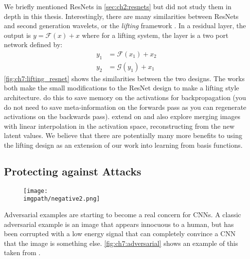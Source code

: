 We briefly mentioned ResNets in \autoref{sec:ch2:resnets} but did not study them
in depth in this thesis. Interestingly, there are many similarities between
ResNets and second generation wavelets, or the \emph{lifting} framework
\cite{sweldens_lifting_1998,daubechies_factoring_1998}.
In a residual layer, the output is $y = \mathcal{F}(x) + x$ where for a lifting
system, the layer is a two port network defined by:
\begin{align}
  y_1 &= \mathcal{F}(x_1) + x_2 \\
  y_2 &= \mathcal{G}(y_1) + x_1 
\end{align}
\autoref{fig:ch7:lifting_resnet} shows the similarities between the two designs. 
The works \cite{gomez_reversible_2017, jacobsen_i-revnet:_2018} both make the small modifications
to the ResNet design to make a lifting style architecture.
\citeauthor{gomez_reversible_2017} \cite{gomez_reversible_2017} do this to save
memory on the activations for backpropagation (you do not need to save
meta-information on the forwards pass as you can regenerate activations on the
backwards pass). 
\citeauthor{jacobsen_i-revnet:_2018} \cite{jacobsen_i-revnet:_2018} extend on
\cite{gomez_reversible_2017} and also explore merging images with linear
interpolation in the activation space, reconstructing from the new latent
values. We believe that there are potentially many more benefits to using the
lifting design as an extension of our work into learning from basis functions.

\subsection{Protecting against Attacks}
\begin{figure}
  \centering
  \texttt{[image: \\imgpath/negative2.png]}
  \label{fig:ch7:adversarial}
\end{figure}
Adversarial examples are starting to become a real concern for CNNs. A classic
adversarial example is an image that appears innocuous to a human, but has been 
corrupted with a low energy signal that can completely convince a CNN that the
image is something else. \autoref{fig:ch7:adversarial} shows an example of this
taken from \cite{szegedy_intriguing_2014}. 

